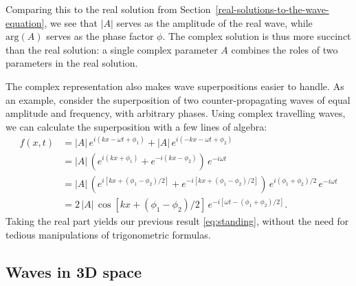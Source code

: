 \documentclass[10pt,a4paper]{article}
\begin{document}
Comparing this to the real solution from
Section~\ref{real-solutions-to-the-wave-equation}, we see that $|A|$
serves as the amplitude of the real wave, while $\mathrm{arg}(A)$
serves as the phase factor $\phi$. The complex solution is thus more
succinct than the real solution: a single complex parameter $A$
combines the roles of two parameters in the real solution.

The complex representation also makes wave superpositions easier to
handle. As an example, consider the superposition of two
counter-propagating waves of equal amplitude and frequency, with
arbitrary phases. Using complex travelling waves, we can calculate the
superposition with a few lines of algebra:
\begin{align}
  f(x,t) &= |A| \, e^{i(kx - \omega t + \phi_1)} + |A| \, e^{i(-kx - \omega t + \phi_2)} \\
  &=  |A|\, \left(e^{i(kx + \phi_1)} + e^{-i(kx - \phi_2)}\right)\, e^{-i\omega t} \\
  &= |A|\, \left(e^{i[kx + (\phi_1-\phi_2)/2]} + e^{-i[kx + (\phi_1 - \phi_2)/2]}\right)\, e^{i(\phi_1 + \phi_2)/2} \,e^{-i\omega t} \\
  &= \displaystyle 2\,|A|\, \cos\left[kx + (\phi_1-\phi_2)/2\right] \,e^{-i[\omega t -(\phi_1+\phi_2)/2]}.
\end{align}
Taking the real part yields our previous result \eqref{eq:standing},
without the need for tedious manipulations of trigonometric formulas.

\subsection{Waves in 3D space}
\label{waves-in-3d-space}
\end{document}
